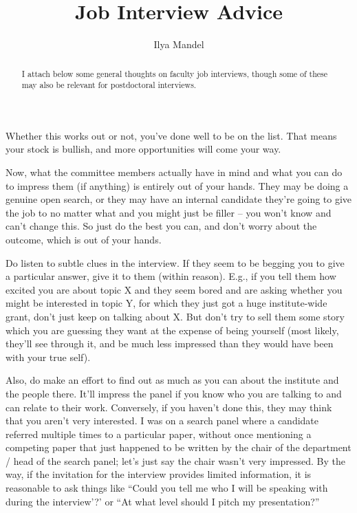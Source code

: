 \documentclass[onecolumn]{aastex7}
\begin{document}
\title{Job Interview Advice}
\author[0000-0002-6134-8946]{Ilya Mandel}


\begin{abstract}
I attach below some general thoughts on faculty job interviews, though some of these may also be relevant for postdoctoral interviews.
\end{abstract}

\maketitle

\vspace{0.1in}

Whether this works out or not, you’ve done well to be on the list. That means your stock is bullish, and more opportunities will come your way.

Now, what the committee members actually have in mind and what you can do to impress them (if anything) is entirely out of your hands. They may be doing a genuine open search, or they may have an internal candidate they’re going to give the job to no matter what and you might just be filler -- you won’t know and can’t change this. So just do the best you can, and don’t worry about the outcome, which is out of your hands.

Do listen to subtle clues in the interview. If they seem to be begging you to give a particular answer, give it to them (within reason). E.g., if you tell them how excited you are about topic X and they seem bored and are asking whether you might be interested in topic Y, for which they just got a huge institute-wide grant, don’t just keep on talking about X.  But don’t try to sell them some story which you are guessing they want at the expense of being yourself (most likely, they’ll see through it, and be much less impressed than they would have been with your true self).

Also, do make an effort to find out as much as you can about the institute and the people there. It’ll impress the panel if you know who you are talking to and can relate to their work. Conversely, if you haven’t done this, they may think that you aren’t very interested. I was on a search panel where a candidate referred multiple times to a particular paper, without once mentioning a competing paper that just happened to be written by the chair of the department / head of the search panel; let’s just say the chair wasn’t very impressed.  By the way, if the invitation for the interview provides limited information, it is reasonable to ask things like ``Could you tell me who I will be speaking with during the interview'?' or ``At what level should I pitch my presentation?''
\end{document}
